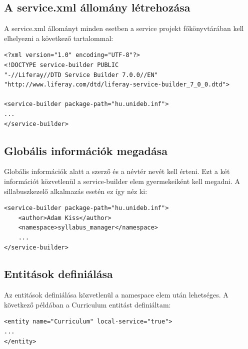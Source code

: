 \documentclass[hidelinks, 12pt, a4paper]{report}
\begin{document}
\subsection{A service.xml állomány létrehozása}

A service.xml állományt minden esetben a service projekt főkönyvtárában kell elhelyezni a következő tartalommal:

\begin{minipage}{\linewidth}
\begin{lstlisting}[basicstyle=\small]
<?xml version="1.0" encoding="UTF-8"?>
<!DOCTYPE service-builder PUBLIC
"-//Liferay//DTD Service Builder 7.0.0//EN"
"http://www.liferay.com/dtd/liferay-service-builder_7_0_0.dtd">

<service-builder package-path="hu.unideb.inf">
...
</service-builder>
\end{lstlisting}
\end{minipage}

\subsection{Globális információk megadása}

Globális információk alatt a szerző és a névtér nevét kell érteni. Ezt a két információt közvetlenül a service-builder elem gyermekeiként kell megadni. A sillabuszkezelő alkalmazás esetén ez így néz ki:

\begin{minipage}{\linewidth}
\begin{lstlisting}[basicstyle=\small]
<service-builder package-path="hu.unideb.inf">
	<author>Adam Kiss</author>
	<namespace>syllabus_manager</namespace>
	...
</service-builder>
\end{lstlisting}
\end{minipage}

\subsection{Entitások definiálása}

Az entitások definiálása közvetlenül a namespace elem után lehetséges. A következő példában a Curriculum entitást definiáltam:

\begin{minipage}{\linewidth}
\begin{lstlisting}[basicstyle=\small]
<entity name="Curriculum" local-service="true">
...
</entity>
\end{lstlisting}
\end{minipage}
\end{document}
